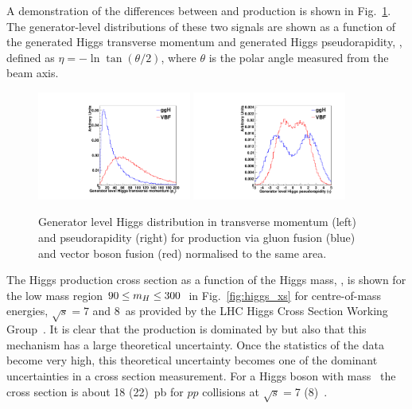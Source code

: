 A demonstration of the differences between \ggH and \VBF production is shown in Fig.~\ref{fig:gen_level}. The generator-level distributions of these two signals are shown as a function of the generated Higgs transverse momentum and generated Higgs pseudorapidity, \eta, defined as $\eta=-\ln\tan(\theta/2)$, where $\theta$ is the polar angle measured from the beam axis. 
\begin{figure}
  \includegraphics[width=0.45\textwidth]{theory/plots/genPT.pdf}
  \includegraphics[width=0.45\textwidth]{theory/plots/genEta.pdf}
  \caption[Generator level Higgs distributions]{Generator level Higgs distribution in transverse momentum (left) and pseudorapidity (right) for production via gluon fusion (blue) and vector boson fusion (red) normalised to the same area.}
  \label{fig:gen_level}
\end{figure}

The \SM Higgs production cross section as a function of the Higgs mass, \mH, is shown for the low mass region $90\leq m_{H}\leq 300$~\GeV in Fig.~\ref{fig:higgs_xs} for centre-of-mass energies, $\sqrt{s}=7$ and 8~\TeV as provided by the LHC Higgs Cross Section Working Group~\cite{LHCHiggsCrossSectionWorkingGroup3}. It is clear that the production is dominated by \ggH but also that this mechanism has a large theoretical uncertainty. Once the statistics of the \LHC data become very high, this theoretical uncertainty becomes one of the dominant uncertainties in a cross section measurement. For a \SM Higgs boson with mass ~\GeV the cross section is about 18 (22)~pb for $pp$ collisions at $\sqrt{s}=$7 (8)~\TeV.

